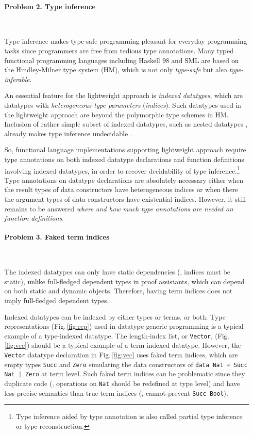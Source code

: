 \paragraph{Problem 2. \textbf{Type inference}} ~

Type inference makes type-safe programming pleasant for everyday programming
tasks since programmers are free from tedious type annotations.
Many typed functional programming languages including Haskell 98 and SML
are based on the Hindley-Milner type system (HM), which is not only
\emph{type-safe} but also \emph{type-inferable}.

An essential feature for the lightweight approach is \emph{indexed datatypes},
which are datatypes with \emph{heterogeneous type parameters}
(\aka \emph{indices}). Such datatypes used in the lightweight approach are
beyond the polymorphic type schemes in HM. Inclusion of rather simple subset of
indexed datatypes, such as nested datatypes \cite{BirMee98}, already makes
type inference undecidable \cite{Henglein93}.

So, functional language implementations supporting lightweight approach
require type annotations on both indexed datatype declarations and
function definitions involving indexed datatypes, in order to recover
decidability of type inference.\footnote{
	Type inference aided by type annotation is also called
	partial type inference or type reconstruction.}
Type annotations on datatype declarations are absolutely necessary
either when the result types of data constructors have heterogeneous indices
or when there the argument types of data constructors have existential indices.
However, it still remains to be answered
\emph{where and how much type annotations are needed on function definitions}.

\paragraph{Problem 3. \textbf{Faked term indices}} ~

The indexed datatypes can only have static dependencies
(\ie, indices must be static), unlike full-fledged dependent types
in proof assistants, which can depend on both static and dynamic objects.
Therefore, having term indices does not imply full-fledged dependent types,

Indexed datatypes can be indexed by either types or terms, or both.
Type representations \cite{CheHin03} (Fig.\,\ref{fig:rep}) used in
datatype generic programming is a typical example of a type-indexed datatype.
The length-index list, or \texttt{Vector}, (Fig.\,\ref{fig:vec})
should be a typical example of a term-indexed datatype.
However, the \texttt{Vector} datatype declaration in Fig.\,\ref{fig:vec}
uses faked term indices, which are empty types \verb|Succ| and \verb|Zero|
simulating the data constructors of \verb/data Nat = Succ Nat | Zero/
at term level. Such faked term indices can be problematic since
they duplicate code (\ie, operations on \texttt{Nat} should be redefined
at type level) and have less precise semantics than true term indices
(\eg, cannot prevent \texttt{Succ Bool}).

